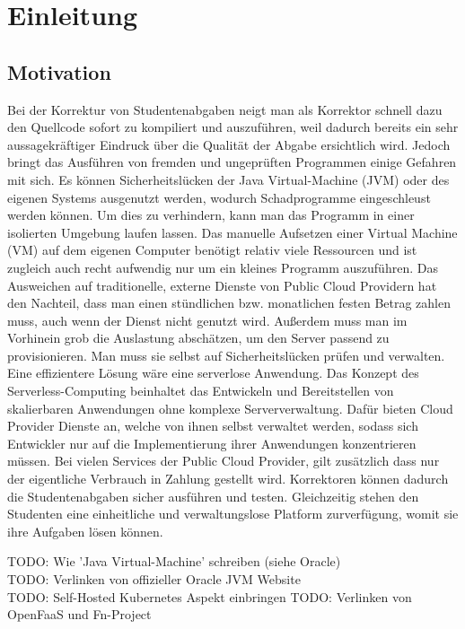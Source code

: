 \chapter{Einleitung}

\section{Motivation}
Bei der Korrektur von Studentenabgaben neigt man als Korrektor schnell dazu den Quellcode
sofort zu kompiliert und auszuführen, weil dadurch bereits ein sehr aussagekräftiger Eindruck
über die Qualität der Abgabe ersichtlich wird. Jedoch bringt das Ausführen von fremden und ungeprüften Programmen einige Gefahren mit sich.
Es können Sicherheitslücken der Java Virtual-Machine (JVM)
oder des eigenen Systems ausgenutzt werden, wodurch Schadprogramme eingeschleust werden können.
Um dies zu verhindern, kann man das Programm in einer isolierten Umgebung laufen lassen.
Das manuelle Aufsetzen einer Virtual Machine (VM) auf dem eigenen Computer benötigt relativ
viele Ressourcen und ist zugleich auch recht aufwendig nur um ein kleines Programm auszuführen.
Das Ausweichen auf traditionelle, externe Dienste von Public Cloud Providern hat den Nachteil,
dass man einen stündlichen bzw. monatlichen festen Betrag zahlen muss,
auch wenn der Dienst nicht genutzt wird. Außerdem muss man im Vorhinein grob die Auslastung
abschätzen, um den Server passend zu provisionieren.
Man muss sie selbst auf Sicherheitslücken prüfen und verwalten.
Eine effizientere Lösung wäre eine serverlose Anwendung.
Das Konzept des Serverless-Computing beinhaltet das Entwickeln und Bereitstellen
von skalierbaren Anwendungen ohne komplexe Serververwaltung. 
Dafür bieten Cloud Provider Dienste an, welche von ihnen selbst verwaltet werden,
sodass sich Entwickler nur auf die Implementierung ihrer Anwendungen konzentrieren müssen.
Bei vielen Services der Public Cloud Provider, gilt zusätzlich dass nur der eigentliche Verbrauch in Zahlung gestellt wird.
Korrektoren können dadurch die Studentenabgaben sicher ausführen und testen.
Gleichzeitig stehen den Studenten eine einheitliche und verwaltungslose Platform zurverfügung,
womit sie ihre Aufgaben lösen können.

TODO: Wie 'Java Virtual-Machine' schreiben (siehe Oracle)\\
TODO: Verlinken von offizieller Oracle JVM Website\\
TODO: Self-Hosted Kubernetes Aspekt einbringen
TODO: Verlinken von OpenFaaS und Fn-Project


